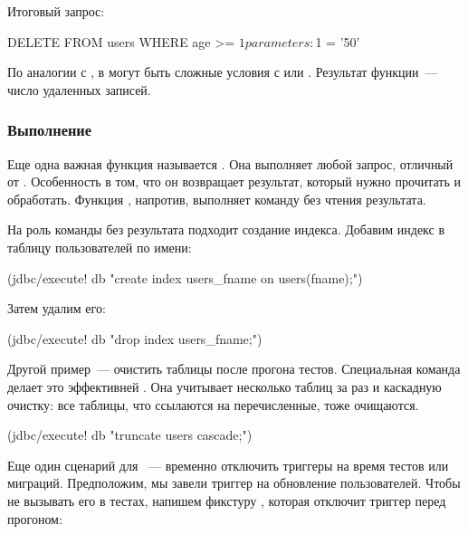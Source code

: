 Итоговый запрос:

\begin{english}
  \begin{sql}
DELETE FROM users WHERE age >= $1
parameters: $1 = '50'
  \end{sql}
\end{english}

По аналогии с , в  могут быть сложные условия с  или . Результат функции~--- число удаленных записей.

\subsubsection{Выполнение}

Еще одна важная функция называется . Она выполняет любой запрос, отличный от . Особенность  в том, что он возвращает результат, который нужно прочитать и обработать. Функция , напротив, выполняет команду без чтения результата.

На роль команды без результата подходит создание индекса. Добавим индекс в таблицу пользователей по имени:

\begin{english}
  \begin{clojure}
(jdbc/execute! db "create index users_fname on users(fname);")
  \end{clojure}
\end{english}

Затем удалим его:

\begin{english}
  \begin{clojure}
(jdbc/execute! db "drop index users_fname;")
  \end{clojure}
\end{english}

Другой пример~--- очистить таблицы после прогона тестов. Специальная команда  делает это эффективней . Она учитывает несколько таблиц за раз и каскадную очистку: все таблицы, что ссылаются на перечисленные, тоже очищаются.

\begin{english}
  \begin{clojure}
(jdbc/execute! db "truncate users cascade;")
  \end{clojure}
\end{english}

Еще один сценарий для ~--- временно отключить триггеры на время тестов или миграций. Предположим, мы завели триггер на обновление пользователей. Чтобы не вызывать его в тестах, напишем фикстуру , которая отключит триггер перед прогоном:

